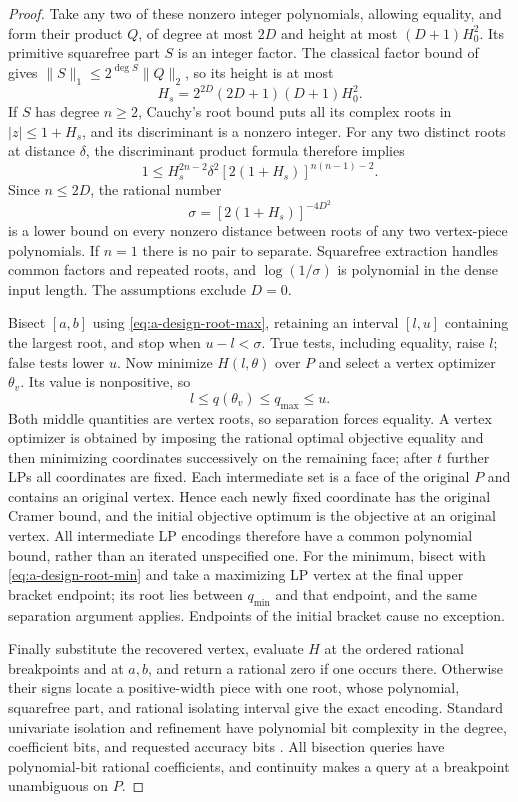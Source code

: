 \begin{proof}
Take any two of these nonzero integer polynomials, allowing equality,
and form their product $Q$, of degree at most $2D$ and height at
most $(D+1)H_0^2$.  Its primitive squarefree part $S$ is an integer
factor.  The classical factor bound of \citet{mignotte1974-factor}
gives $\|S\|_1\le2^{\deg S}\|Q\|_2$, so its height is at most
\[
 H_s=2^{2D}(2D+1)(D+1)H_0^2.
\]
If $S$ has degree $n\ge2$, Cauchy's root bound puts all its complex
roots in $|z|\le1+H_s$, and its discriminant is a nonzero integer.  For
any two distinct roots at distance $\delta$, the discriminant product
formula therefore implies
\[
 1\le H_s^{2n-2}\delta^2
            [2(1+H_s)]^{n(n-1)-2}.
\]
Since $n\le2D$, the rational number
\begin{equation}
 \sigma=[2(1+H_s)]^{-4D^2}
 \label{eq:a-design-separation}
\end{equation}
is a lower bound on every nonzero distance between roots of any two
vertex-piece polynomials.  If $n=1$ there is no pair to separate.
Squarefree extraction handles common factors and repeated roots, and
$\log(1/\sigma)$ is polynomial in the dense input length.
The assumptions exclude $D=0$.

Bisect $[a,b]$ using \eqref{eq:a-design-root-max}, retaining an interval
$[l,u]$ containing the largest root, and stop when $u-l<\sigma$.  True
tests, including equality, raise $l$; false tests lower $u$.
Now minimize $H(l,\theta)$ over $P$ and select a vertex optimizer
$\theta_v$.  Its value is nonpositive, so
\[
 l\le q(\theta_v)\le q_{\max}\le u.
\]
Both middle quantities are vertex roots, so separation forces equality.
A vertex optimizer is obtained by imposing the rational optimal
objective equality and then minimizing coordinates successively on
the remaining face; after $t$ further LPs all coordinates are fixed.
Each intermediate set is a face of the original $P$ and contains an
original vertex.  Hence each newly fixed coordinate has the original
Cramer bound, and the initial objective optimum is the objective at
an original vertex.  All intermediate LP encodings therefore have a
common polynomial bound, rather than an iterated unspecified one.
For the minimum, bisect with \eqref{eq:a-design-root-min} and take a
maximizing LP vertex at the final upper bracket endpoint; its root
lies between $q_{\min}$ and that endpoint, and the same separation
argument applies.  Endpoints of the initial bracket cause no exception.

Finally substitute the recovered vertex, evaluate $H$ at the ordered
rational breakpoints and at $a,b$, and return a rational zero if one
occurs there.  Otherwise their signs locate a positive-width piece
with one root, whose polynomial, squarefree part, and rational
isolating interval give the exact encoding.  Standard univariate
isolation and refinement have polynomial bit complexity in the degree,
coefficient bits, and requested accuracy bits
\citep{basu2006-algorithms-in-real-algebraic-geometry}.
All bisection queries have polynomial-bit rational coefficients, and
continuity makes a query at a breakpoint unambiguous on $P$.
\end{proof}


